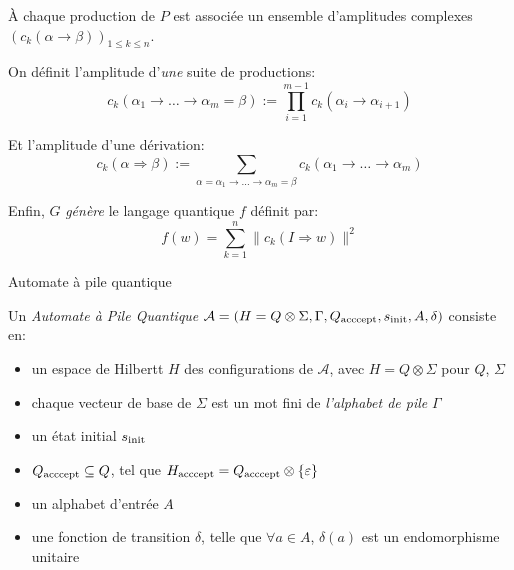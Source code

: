 \documentclass[aspectratio=169]{beamer}
\theoremstyle{plain}
\theoremstyle{definition}
\begin{document}
\begin{frame}
    À chaque production de $P$ est associée un ensemble d'amplitudes complexes $\left(c_k(\alpha\to\beta)\right)_{1\leq k\leq n}$.
    
    On définit l'amplitude d'\emph{une} suite de productions:
    \begin{equation*}
        c_k(\alpha_1 \to \dots \to \alpha_m=\beta) := \prod_{i=1}^{m-1} c_k(\alpha_i\to\alpha_{i+1})
    \end{equation*}

    Et l'amplitude d'une dérivation:
    \begin{equation*}
        c_k(\alpha\Rightarrow\beta) := \sum_{\alpha=\alpha_1 \to \dots \to \alpha_m=\beta} c_k(\alpha_1 \to \dots \to \alpha_m)
    \end{equation*}

    Enfin, $G$ \emph{génère} le langage quantique $f$ définit par:
    \begin{equation*}
        f(w) = \sum_{k=1}^n \|c_k(I\Rightarrow w)\|^2
    \end{equation*}
\end{frame}

\begin{frame}{Automate à pile quantique}
    \begin{definition}[QPDA]
        Un \emph{Automate à Pile Quantique} $\mathcal{A}=(H=Q\otimes \Sigma, \Gamma, Q_{\textnormal{acccept}}, s_{\textnormal{init}}, A, \delta)$ consiste en:
        \begin{itemize}[label=--, noitemsep]
            \item un espace de Hilbertt $H$ des configurations de $\mathcal{A}$, avec $H=Q\otimes \Sigma$ pour $Q$, $\Sigma$
            \item chaque vecteur de base de $\Sigma$ est un mot fini de \emph{l'alphabet de pile} $\Gamma$
            \item un état initial $s_{\textnormal{init}}$
            \item $Q_{\textnormal{acccept}} \subseteq Q$, tel que $H_{\textnormal{acccept}}=Q_{\textnormal{acccept}}\otimes \{\varepsilon\}$
            \item un alphabet d'entrée $A$
            \item une fonction de transition $\delta$, telle que $\forall a\in A$, $\delta(a)$ est un endomorphisme unitaire
        \end{itemize}
    \end{definition}
\end{frame}
\end{document}
